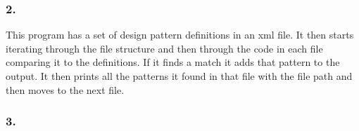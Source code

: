 \documentclass{article}
\begin{document}
\subsubsection*{2.}
This program has a set of design pattern definitions in an xml file. It then starts iterating through the file structure and then through the code in each file comparing it to the definitions. If it finds a match it adds that pattern to the output. It then prints all the patterns it found in that file with the file path and then moves to the next file. 
\subsubsection*{3.}
\end{document}

